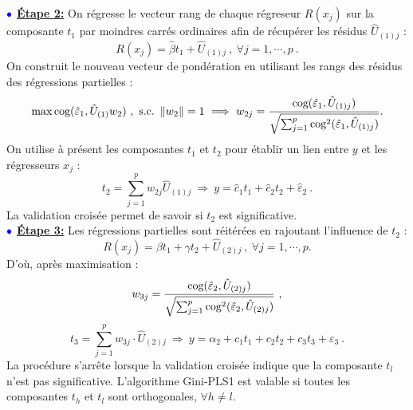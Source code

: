 $\bulle$ \underline{\textbf{Étape 2:}}  On régresse le vecteur rang de chaque régreseur $R(x_j)$ sur la composante $t_1$ par moindres carrés ordinaires afin de récupérer les résidus $\hat{U}_{(1)j}$ : 
\[
R(x_j) = \hat{\beta}t_1 + \hat{U}_{(1)j} \ , \ \forall j = 1,\cdots, p \ .
\]
On construit le nouveau vecteur de pondération en utilisant les rangs des résidus des régressions partielles :
\[
\mathop{\mathrm{max}}\limits \text{cog}(\hat{\varepsilon}_1,\hat{U}_{(1)} w_2) \ , \ \text{s.c.} \ \left\|w_2\right\|=1 \ \Longrightarrow \ w_{2j} = \frac{\text{cog}(\hat{\varepsilon}_1,\hat{U}_{(1)j})}{\sqrt{\sum_{j=1}^p \text{cog}^2(\hat{\varepsilon}_1,\hat{U}_{(1)j})}} .
\]
On utilise à présent les composantes $t_1$ et $t_2$ pour établir un lien entre $y$ et les régresseurs $x_j$ :
\[
t_2 = \sum^p_{j=1} w_{2j} \hat{U}_{(1)j} \ \Longrightarrow \ y = \hat{c}_1 t_1 + \hat{c}_2 t_2 + \hat{\varepsilon}_2 \ .
\]
La validation croisée permet de savoir si $t_2$ est significative.\\

$\bulle$ \underline{\textbf{Étape 3:}} Les régressions partielles sont réitérées en rajoutant l'influence de $t_2$ :
\[
R(x_j) = \beta t_1 + \gamma t_2 + \hat{U}_{(2)j} \ , \ \forall j = 1,\cdots, p.
\]
D'où, après maximisation :
\[
w_{3j} = \frac{\text{cog}(\hat{\varepsilon}_2,\hat{U}_{(2)j})}{\sqrt{\sum_{j=1}^p \text{cog}^2(\hat{\varepsilon}_2,\hat{U}_{(2)j})}} \ ,
\]
\[
t_3 = \sum_{j=1}^p w_{3j}\cdot \hat{U}_{(2)j} \ \Longrightarrow \ y = \alpha_2 + c_1 t_1 + c_2 t_2 + c_3 t_3 + \varepsilon_3 \ .
\]
La procédure s'arrête lorsque la validation croisée indique que la composante $t_l$ n'est pas significative. L'algorithme Gini-PLS1 est valable si toutes les composantes $t_h$ et $t_l$ sont orthogonales, $\forall h\neq l$. 

\medskip

